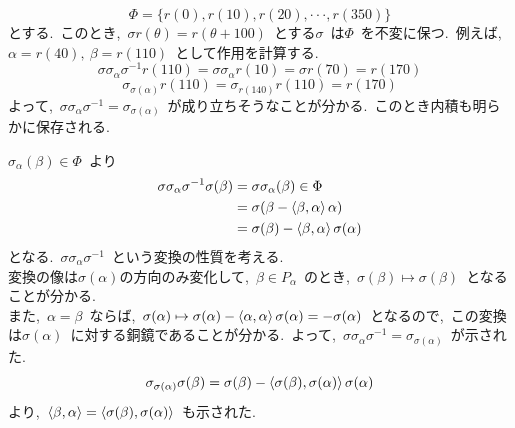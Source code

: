 \documentclass[uplatex,dvipdfmx]{jsarticle}
\begin{document}
\begin{equation*}
    \Phi = \{r(0), r(10), r(20), \cdot\cdot\cdot, r(350)\}
\end{equation*}
とする.~このとき,~$\sigma r(\theta) = r(\theta + 100)$~とする$\sigma$~は$\Phi$~を不変に保つ.~例えば,~$\alpha = r(40),~ \beta = r(110)$~として作用を計算する.\\
\begin{equation*}
    \sigma \sigma_\alpha \sigma^{-1} r(110) = \sigma \sigma_\alpha r(10) = \sigma r(70) = r(170) 
\end{equation*}
\begin{equation*}
    \sigma_{\sigma(\alpha)} r(110) = \sigma_{r(140)} r(110) = r(170)
\end{equation*}
よって,~$\sigma \sigma_\alpha \sigma^{-1} = \sigma_{\sigma(\alpha)}$~が成り立ちそうなことが分かる.~このとき内積も明らかに保存される.\\
\begin{myproof}
    $\sigma_\alpha(\beta) \in \Phi$~より
    \begin{equation*}
        \begin{split}
            \sigma \sigma_\alpha \sigma^{-1} \sigma(\beta) &= \sigma \sigma_\alpha (\beta) \in \Phi\\
            &= \sigma(\beta - \ev{\beta, \alpha}\alpha)\\
            &= \sigma(\beta) - \ev{\beta, \alpha} \sigma(\alpha)
        \end{split}
    \end{equation*}
    となる.~$\sigma \sigma_\alpha \sigma^{-1}$~という変換の性質を考える.\\
    変換の像は$\sigma(\alpha)$の方向のみ変化して,~$\beta \in P_\alpha$~のとき,~$\sigma(\beta) \mapsto \sigma(\beta)$~となることが分かる.~\\
    また,~$\alpha = \beta$~ならば,~$\sigma(\alpha) \mapsto \sigma(\alpha) - \ev{\alpha, \alpha} \sigma(\alpha) = -\sigma(\alpha)$~となるので,~この変換は$\sigma(\alpha)$~に対する銅鏡であることが分かる.~よって,~$\sigma \sigma_\alpha \sigma^{-1} = \sigma_{\sigma(\alpha)}$~が示された.\\
    \begin{equation*}
        \sigma_{\sigma(\alpha)} \sigma(\beta) = \sigma(\beta) - \ev{\sigma(\beta), \sigma(\alpha)} \sigma(\alpha)
    \end{equation*}
    より,~$\ev{\beta, \alpha} = \ev{\sigma(\beta), \sigma(\alpha)}$~も示された.
\end{myproof}
\end{document}
